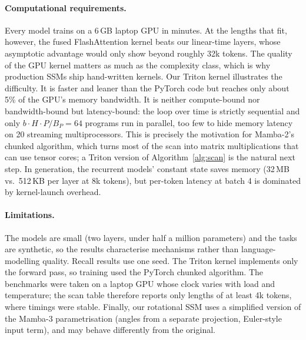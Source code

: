 \paragraph{Computational requirements.} Every model trains on a 6\,GB laptop GPU in minutes. At the lengths that
fit, however, the fused FlashAttention kernel \citep{dao2022flashattention} beats our linear-time layers, whose
asymptotic advantage would only show beyond roughly 32k tokens. The quality of the GPU kernel matters as much as
the complexity class, which is why production SSMs ship hand-written kernels. Our Triton kernel illustrates the
difficulty. It is faster and leaner than the PyTorch code but reaches only about 5\% of the GPU's memory
bandwidth. It is neither compute-bound nor bandwidth-bound but latency-bound: the loop over time is strictly
sequential and only $b\cdot H\cdot P/B_P = 64$ programs run in parallel, too few to hide memory latency on 20
streaming multiprocessors. This is precisely the motivation for Mamba-2's chunked algorithm, which turns most of
the scan into matrix multiplications that can use tensor cores; a Triton version of Algorithm~\ref{alg:scan} is
the natural next step. In generation, the recurrent models' constant state saves memory (32\,MB vs.\ 512\,KB per
layer at 8k tokens), but per-token latency at batch 4 is dominated by kernel-launch overhead.

\paragraph{Limitations.} The models are small (two layers, under half a million parameters) and the tasks are
synthetic, so the results characterise mechanisms rather than language-modelling quality. Recall results use one
seed. The Triton kernel implements only the forward pass, so training used the PyTorch chunked algorithm. The
benchmarks were taken on a laptop GPU whose clock varies with load and temperature; the scan table therefore
reports only lengths of at least 4k tokens, where timings were stable. Finally, our rotational SSM uses a
simplified version of the Mamba-3 parametrisation (angles from a separate projection, Euler-style input term), and
may behave differently from the original.

